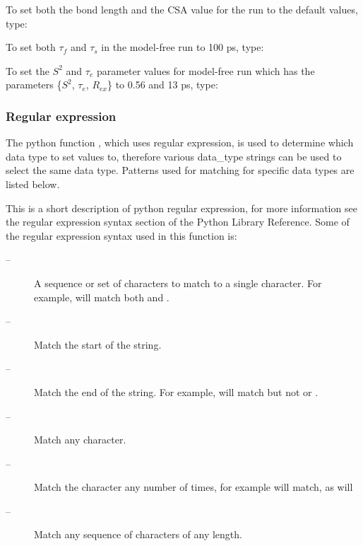 To set both the bond length and the CSA value for the run  to the default values, type:



To set both $\tau_f$ and $\tau_s$ in the model-free run  to 100 ps, type:




To set the $S^2$ and $\tau_e$ parameter values for model-free run  which has the parameters \{$S^2$, $\tau_e$, $R_{ex}$\} to 0.56 and 13 ps, type:






\subsubsection{Regular expression}

The python function , which uses regular expression, is used to determine which data type to set values to, therefore various data\_type strings can be used to select the same data type.  Patterns used for matching for specific data types are listed below.


This is a short description of python regular expression, for more information see the regular expression syntax section of the Python Library Reference.  Some of the regular expression syntax used in this function is:


\begin{description}
\item[\quotecmd{[]} --]  A sequence or set of characters to match to a single character.  For example,  will match both  and . 
\item[\quotecmd{\^{}} --]  Match the start of the string. 
\item[\quotecmd{\$} --]  Match the end of the string.  For example,  will match  but not  or . 
\item[ --]  Match any character. 
\item[ --]  Match the character  any number of times, for example  will match, as will  
\item[ --]  Match any sequence of characters of any length. 
\end{description}


